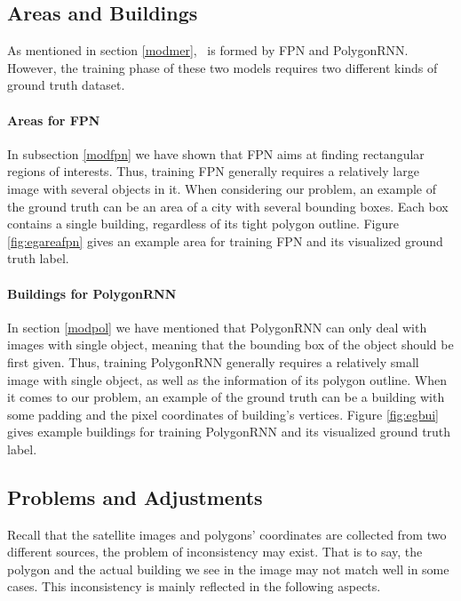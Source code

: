 \subsection{Areas and Buildings}\label{arebui}

As mentioned in section \ref{modmer}, \modelnameshort\ is formed by FPN and PolygonRNN. However, the training phase of these two models requires two different kinds of ground truth dataset.

\paragraph{Areas for FPN}
In subsection \ref{modfpn} we have shown that FPN aims at finding rectangular regions of interests. Thus, training FPN generally requires a relatively large image with several objects in it. When considering our problem, an example of the ground truth can be an area of a city with several bounding boxes. Each box contains a single building, regardless of its tight polygon outline. Figure \ref{fig:egareafpn} gives an example area for training FPN and its visualized ground truth label.



\paragraph{Buildings for PolygonRNN}
In section \ref{modpol} we have mentioned that PolygonRNN can only deal with images with single object, meaning that the bounding box of the object should be first given. Thus, training PolygonRNN generally requires a relatively small image with single object, as well as the information of its polygon outline. When it comes to our problem, an example of the ground truth can be a building with some padding and the pixel coordinates of building's vertices. Figure \ref{fig:egbui} gives example buildings for training PolygonRNN and its visualized ground truth label.



\subsection{Problems and Adjustments}\label{proadj}

Recall that the satellite images and polygons' coordinates are collected from two different sources, the problem of inconsistency may exist. That is to say, the polygon and the actual building we see in the image may not match well in some cases. This inconsistency is mainly reflected in the following aspects.

